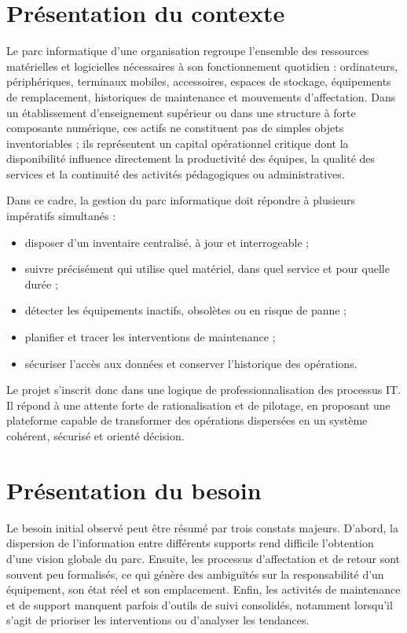 \section{Présentation du contexte}
Le parc informatique d'une organisation regroupe l'ensemble des ressources matérielles et logicielles nécessaires à son fonctionnement quotidien : ordinateurs, périphériques, terminaux mobiles, accessoires, espaces de stockage, équipements de remplacement, historiques de maintenance et mouvements d'affectation. Dans un établissement d'enseignement supérieur ou dans une structure à forte composante numérique, ces actifs ne constituent pas de simples objets inventoriables ; ils représentent un capital opérationnel critique dont la disponibilité influence directement la productivité des équipes, la qualité des services et la continuité des activités pédagogiques ou administratives.

Dans ce cadre, la gestion du parc informatique doit répondre à plusieurs impératifs simultanés :
\begin{itemize}
  \item disposer d'un inventaire centralisé, à jour et interrogeable ;
  \item suivre précisément qui utilise quel matériel, dans quel service et pour quelle durée ;
  \item détecter les équipements inactifs, obsolètes ou en risque de panne ;
  \item planifier et tracer les interventions de maintenance ;
  \item sécuriser l'accès aux données et conserver l'historique des opérations.
\end{itemize}

Le projet s'inscrit donc dans une logique de professionnalisation des processus IT. Il répond à une attente forte de rationalisation et de pilotage, en proposant une plateforme capable de transformer des opérations dispersées en un système cohérent, sécurisé et orienté décision.

\section{Présentation du besoin}
Le besoin initial observé peut être résumé par trois constats majeurs. D'abord, la dispersion de l'information entre différents supports rend difficile l'obtention d'une vision globale du parc. Ensuite, les processus d'affectation et de retour sont souvent peu formalisés, ce qui génère des ambiguïtés sur la responsabilité d'un équipement, son état réel et son emplacement. Enfin, les activités de maintenance et de support manquent parfois d'outils de suivi consolidés, notamment lorsqu'il s'agit de prioriser les interventions ou d'analyser les tendances.

